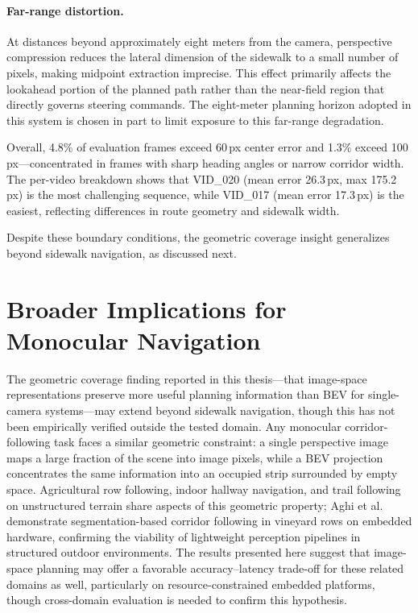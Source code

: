 \documentclass[12pt,letterpaper,oneside]{report}
\begin{document}
\paragraph{Far-range distortion.}
At distances beyond approximately eight meters from the camera, perspective compression reduces the lateral dimension of the sidewalk to a small number of pixels, making midpoint extraction imprecise.  This effect primarily affects the lookahead portion of the planned path rather than the near-field region that directly governs steering commands.  The eight-meter planning horizon adopted in this system is chosen in part to limit exposure to this far-range degradation.

\medskip
Overall, 4.8\% of evaluation frames exceed 60\,px center error and 1.3\% exceed 100\,px---concentrated in frames with sharp heading angles or narrow corridor width.  The per-video breakdown shows that VID\_020 (mean error 26.3\,px, max 175.2\,px) is the most challenging sequence, while VID\_017 (mean error 17.3\,px) is the easiest, reflecting differences in route geometry and sidewalk width.

Despite these boundary conditions, the geometric coverage insight generalizes beyond sidewalk navigation, as discussed next.


\section{Broader Implications for Monocular Navigation}
\label{sec:broader_implications}

The geometric coverage finding reported in this thesis---that image-space representations preserve more useful planning information than BEV for single-camera systems---may extend beyond sidewalk navigation, though this has not been empirically verified outside the tested domain.  Any monocular corridor-following task faces a similar geometric constraint: a single perspective image maps a large fraction of the scene into image pixels, while a BEV projection concentrates the same information into an occupied strip surrounded by empty space.  Agricultural row following, indoor hallway navigation, and trail following on unstructured terrain share aspects of this geometric property; Aghi et al.~\cite{aghi2021local} demonstrate segmentation-based corridor following in vineyard rows on embedded hardware, confirming the viability of lightweight perception pipelines in structured outdoor environments.  The results presented here suggest that image-space planning may offer a favorable accuracy--latency trade-off for these related domains as well, particularly on resource-constrained embedded platforms, though cross-domain evaluation is needed to confirm this hypothesis.
\end{document}
